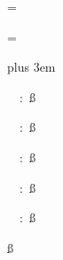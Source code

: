 \newtoks\cavename
\newtoks\comment
\newtoks\legendtitle
\newif\ifnortharrow
\newif\ifscalebar
\newtoks\explotitle
\newtoks\explodate
\newtoks\exploteam
\newtoks\topotitle
\newtoks\topodate
\newtoks\topoteam
\newtoks\cartotitle
\newtoks\cartodate
\newtoks\cartoteam
\newtoks\copyrights
\newtoks\cavelength
\newtoks\cavedepth
\newtoks\cavelengthtitle
\newtoks\cavedepthtitle

\def\scalebar{\pdfrefxform\THWscalebar}
\def\northarrow{\pdfrefxform\THWnortharrow}
\newdimen\legendwidth \legendwidth=14cm
\newcount\legendcolumns {}

\legendcontent={%
  \hsize=\legendwidth
  \ifnortharrow\vbox to 0pt{\line{\hfil\northarrow}\vss}\fi
  \edef\tmp{\the\cavename} \ifx\tmp\empty \else
    {\size[26]\the\cavename} \vskip1cm
  \fi
  \ifscalebar\scalebar\vskip1cm\fi
  {\rightskip=0pt plus 3em\parskip=3bp
    \edef\tmp{\the\comment} \ifx\tmp\empty \else
      {\size[12]\the\comment} \par\medskip
    \fi
    \edef\tmp{\the\cavelength} \ifx\tmp\empty \else
      {\size[12]\si\the\cavelengthtitle: \ss\the\cavelength\par}
    \fi
    \edef\tmp{\the\cavedepth} \ifx\tmp\empty \else
      {\size[12]\si\the\cavedepthtitle: \ss\the\cavedepth\par}
    \fi
    \edef\tmp{\the\exploteam} \ifx\tmp\empty \else
      {\size[12]\si\the\explotitle: \ss\the\exploteam\quad\si\the\explodate\par}
    \fi
    \edef\tmp{\the\topoteam} \ifx\tmp\empty \else
      {\size[12]\si\the\topotitle: \ss\the\topoteam\quad\si\the\topodate\par}
    \fi
    \edef\tmp{\the\cartoteam} \ifx\tmp\empty \else
      {\size[12]\si\the\cartotitle: \ss\the\cartoteam\quad\si\the\cartodate\par}
    \fi
    \edef\tmp{\the\copyrights} \ifx\tmp\empty \else
      {\size[12]\ss\the\copyrights\par}
    \fi
  }
  \formattedlegend
}

\def\maplayout{
  \legendbox{NW}{\the\legendcontent}
  \legendbox{NE}{\northarrow}
}

\def\formattedlegend{\iflegend
  \vskip1cm{\size[14]\the\legendtitle}\bigskip
  \begmulti\legendcolumns\insertlegend\endmulti\fi}
\let\atlaslegend=\formattedlegend

